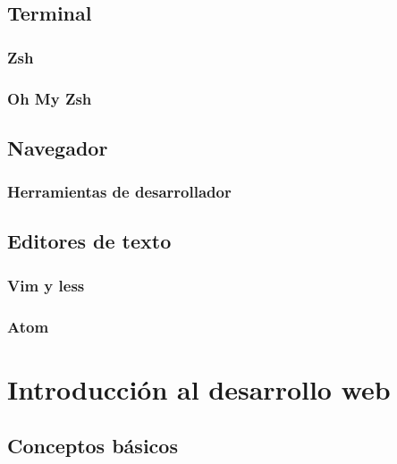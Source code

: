 \documentclass[a4paper,11pt,spanish]{sphinxmanual}
\begin{document}
\section{Terminal}
\label{\detokenize{introduccion:terminal}}

\subsection{Zsh}
\label{\detokenize{introduccion:zsh}}

\subsection{Oh My Zsh}
\label{\detokenize{introduccion:oh-my-zsh}}

\section{Navegador}
\label{\detokenize{introduccion:navegador}}

\subsection{Herramientas de desarrollador}
\label{\detokenize{introduccion:herramientas-de-desarrollador}}

\section{Editores de texto}
\label{\detokenize{introduccion:editores-de-texto}}

\subsection{Vim y less}
\label{\detokenize{introduccion:vim-y-less}}

\subsection{Atom}
\label{\detokenize{introduccion:atom}}

\chapter{Introducción al desarrollo web}
\label{\detokenize{introduccion:introduccion-al-desarrollo-web}}

\section{Conceptos básicos}
\label{\detokenize{introduccion:conceptos-basicos}}
\end{document}
